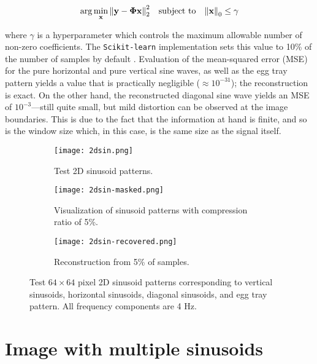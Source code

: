 \begin{equation}\label{eq:omp}
	\arg\min_{\text{\bfseries x}} \norm{\text{\bfseries y} - \bm\Phi \text{\bfseries x}}_2^2 \quad \textrm{subject to} \quad \norm{\text{\bfseries x}}_0 \leq \gamma
\end{equation}

\noindent where $\gamma$ is a hyperparameter which controls the maximum allowable number of non-zero coefficients. The \texttt{Scikit-learn} implementation sets this value to 10\% of the number of samples by default \cite{scikit-learn}. Evaluation of the mean-squared error (MSE) for the pure horizontal and pure vertical sine waves, as well as the egg tray pattern yields a value that is practically negligible ($\approx 10^{-31}$); the reconstruction is exact. On the other hand, the reconstructed diagonal sine wave yields an MSE of $10^{-3}$---still quite small, but mild distortion can be observed at the image boundaries. This is due to the fact that the information at hand is finite, and so is the window size which, in this case, is the same size as the signal itself.

\begin{figure}[htb]
	\centering
	\begin{subfigure}{\textwidth}
		\centering
		\texttt{[image: 2dsin.png]}
		\caption{Test 2D sinusoid patterns.}
		\label{fig:2dsin}
	\end{subfigure}
	\begin{subfigure}{\textwidth}
		\centering
		\texttt{[image: 2dsin-masked.png]}
		\caption{Visualization of sinusoid patterns with compression ratio of 5\%.}
		\label{fig:2dsin-masked}
	\end{subfigure}
	\begin{subfigure}{\textwidth}
		\centering
		\texttt{[image: 2dsin-recovered.png]}
		\caption{Reconstruction from 5\% of samples.}
		\label{fig:2dsin-recovered}
	\end{subfigure}
	\caption{Test $64 \times 64$ pixel 2D sinusoid patterns corresponding to vertical sinusoids, horizontal sinusoids, diagonal sinusoids, and egg tray pattern. All frequency components are 4 Hz.}
	\label{fig:test-2dsin}
\end{figure}


\section{Image with multiple sinusoids}
\label{sec:2dmultisin}

